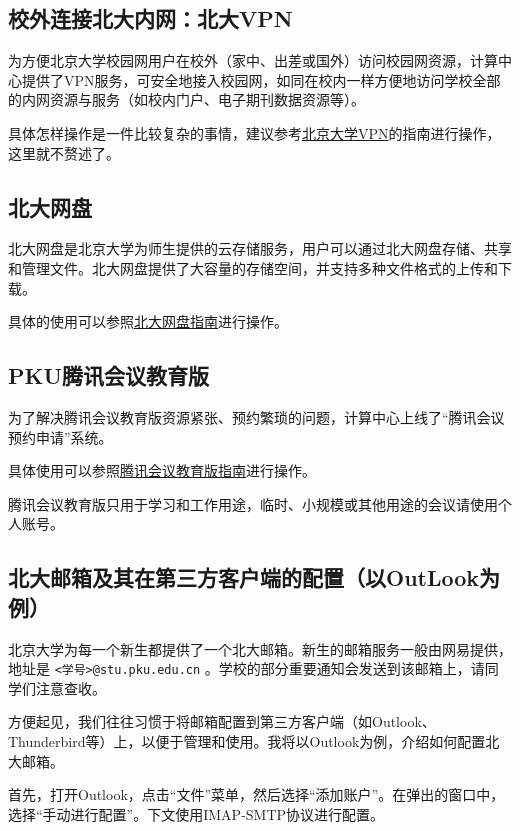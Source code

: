 \subsection{校外连接北大内网：北大VPN}

为方便北京大学校园网用户在校外（家中、出差或国外）访问校园网资源，计算中心提供了VPN服务，可安全地接入校园网，如同在校内一样方便地访问学校全部的内网资源与服务（如校内门户、电子期刊数据资源等）。

具体怎样操作是一件比较复杂的事情，建议参考\href{https://its.pku.edu.cn/service_1_vpn.jsp}{北京大学VPN}的指南进行操作，这里就不赘述了。

\subsection{北大网盘}

北大网盘是北京大学为师生提供的云存储服务，用户可以通过北大网盘存储、共享和管理文件。北大网盘提供了大容量的存储空间，并支持多种文件格式的上传和下载。

具体的使用可以参照\href{https://its.pku.edu.cn/service_1_webdisk.jsp}{北大网盘指南}进行操作。

\subsection{PKU腾讯会议教育版}

为了解决腾讯会议教育版资源紧张、预约繁琐的问题，计算中心上线了“腾讯会议预约申请”系统。

具体使用可以参照\href{https://its.pku.edu.cn/service_1_webex.jsp}{腾讯会议教育版指南}进行操作。

\begin{warning}
  腾讯会议教育版只用于学习和工作用途，临时、小规模或其他用途的会议请使用个人账号。
\end{warning}

\subsection{北大邮箱及其在第三方客户端的配置（以OutLook为例）}

北京大学为每一个新生都提供了一个北大邮箱。新生的邮箱服务一般由网易提供，地址是 \texttt{<学号>@stu.pku.edu.cn} 。学校的部分重要通知会发送到该邮箱上，请同学们注意查收。

方便起见，我们往往习惯于将邮箱配置到第三方客户端（如Outlook、Thunderbird等）上，以便于管理和使用。我将以Outlook为例，介绍如何配置北大邮箱。

首先，打开Outlook，点击“文件”菜单，然后选择“添加账户”。在弹出的窗口中，选择“手动进行配置”。下文使用IMAP-SMTP协议进行配置。

